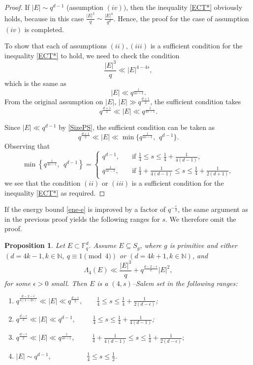 \documentclass[11pt]{article}
\newtheorem{proposition}[theorem]{Proposition}
\begin{document}
\begin{proof}
If $|E|\sim q^{d-1}$ (assumption $(iv))$, then the inequality \eqref{ECT*} obviously holds, because in this case $\frac{|E|^3}{q}\sim \frac{|E|^4}{q^d}$.
Hence,  the proof for the case of assumption $(iv)$ is completed.

To show that each of assumptions $(ii), (iii)$ is a sufficient condition for the inequality \eqref{ECT*} to hold, we need to check the condition $$\frac{|E|^3}{q} \ll |E|^{4-4s},$$
which is the same as 
$$ |E|\ll q^{\frac{1}{4s-1}}.$$
From the original assumption on $|E|$, $|E|\gg q^{\frac{d+1}{2}}$, the sufficient condition takes
$$  q^{\frac{d+1}{2}} \ll |E|\ll q^{\frac{1}{4s-1}}.$$

Since $|E|\ll q^{d-1}$ by \eqref{SizePS},    the sufficient condition  can be taken as
$$  q^{\frac{d+1}{2}} \ll |E|\ll \min\{q^{\frac{1}{4s-1}},  ~~q^{d-1}\}.$$
Observing that 
\[ \min\left\{q^{\frac{1}{4s-1}},  ~~q^{d-1}\right\} = \begin{cases}
    q^{d-1}, \quad                  &\text{if } \frac{1}{4} \le s \le \frac{1}{4}+\frac{1}{4(d-1)},\\
     q^{\frac{1}{4s-1}}, \quad     & \text{if }  \frac{1}{4}+\frac{1}{4(d-1)} \le s \le \frac{1}{4}+ \frac{1}{2(d+1)}, 
    \end{cases}\]
we see that the condition $(ii)$ or $(iii)$ is a sufficient condition for the inequality \eqref{ECT*} as required.
\end{proof}

If the energy bound \eqref{ene-e} is improved by a factor of $q^{-\frac{\epsilon}{2}}$, the same argument as in the previous proof yields the following ranges for $s$. We therefore omit the proof.

\begin{proposition}\label{thm:L4-eps}
Let $E \subset \mathbb{F}_q^d$. Assume $E\subseteq S_g$, where $g$ is primitive and either $(d = 4k - 1, k\in \mathbb{N}, ~q \equiv 1 \pmod{4})$ or $(d = 4k + 1, k\in \mathbb{N})$, and 
\[
\Lambda_4(E) \ll \frac{|E|^3}{q} + q^{\frac{d-2-\epsilon}{2}}|E|^2,
\]
for some $\epsilon > 0$ small. Then $E$ is a $(4,s)$--Salem set in the following ranges:
\begin{enumerate}
    \item[(i)] $
    q^{\frac{d-2-\epsilon}{4(1-2s)}} \ll |E| \ll q^{\frac{d-\epsilon}{2}},
    \qquad \frac{1}{4} \leq s \le \frac{1}{4}+\frac{1}{2(d-\epsilon)}
    $;
    \item[(ii)]   $
    q^{\frac{d-\epsilon}{2}} \ll |E| \ll q^{d-1},
    \qquad ~~  \frac{1}{4} \leq s \le \frac{1}{4}+\frac{1}{4(d-1)}
     $;
    \item[(iii)] $
    q^{\frac{d-\epsilon}{2}} \ll |E| \ll 
    q^{\frac{1}{4s-1}},
    \qquad ~~ \frac{1}{4}+\frac{1}{4(d-1)} \le s \le \frac{1}{4}+\frac{1}{2(d-\epsilon)};
     $
    \item[(iv)] $|E| \sim q^{d-1}, \qquad ~~~~~~~~~~~~~~ \frac{1}{4}\leq s \le\frac{1}{2} $.
\end{enumerate}
\end{proposition}
\end{document}
